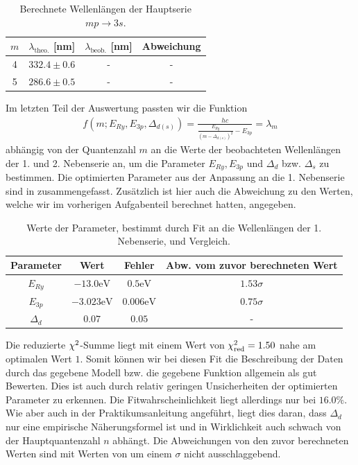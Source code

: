 \begin{table}[H]
  \centering
  \caption{Berechnete Wellenlängen der Hauptserie $mp \to 3s$.}
  \vspace*{0.5em}
  \begin{tabular}{c c c c}
      \hline
      $m$ & $\lambda_{\text{theo.}}$ [nm] & $\lambda_{\text{beob.}}$ [nm] & Abweichung \\
      \hline
      4  & $332.4 \pm 0.6$ & -     & -     \\
      5  & $286.6 \pm 0.5$  & - & - \\
      \hline
  \end{tabular}
  \label{tab:wellenlaengen_hs_zsfm}
\end{table}

Im letzten Teil der Auswertung passten wir die Funktion
\begin{align}
  f(m;E_{Ry}, E_{3p}, \Delta_{d(s)}) = \frac{hc}{\frac{E_{Ry}}{(m - \Delta_{d(s)})^2} - E_{3p}} = \lambda_m
\end{align}
abhängig von der Quantenzahl $m$ an die Werte der beobachteten Wellenlängen der 1. und 2. Nebenserie an, um die Parameter $E_{Ry}, E_{3p}$ und $\Delta_{d}$ bzw. $\Delta_{s}$ zu bestimmen. Die optimierten Parameter aus der Anpassung an die 1. Nebenserie sind in  zusammengefasst. Zusätzlich ist hier auch die Abweichung zu den Werten, welche wir im vorherigen Aufgabenteil berechnet hatten, angegeben.


\begin{table}[H]
  \centering
  \caption{Werte der Parameter, bestimmt durch Fit an die Wellenlängen der 1. Nebenserie, und Vergleich.}
  \vspace*{0.5em}
  \begin{tabular}{c c c c}
      \hline
      Parameter & Wert & Fehler & Abw. vom zuvor berechneten Wert \\
      \hline
      $E_{Ry}$  & $-13.0 \si{\electronvolt}$ & $0.5\si{\electronvolt}$ & $1.53\sigma$ \\
      $E_{3p}$  & $-3.023\si{\electronvolt}$  & $0.006\si{\electronvolt}$ & $0.75\sigma$ \\
      $\Delta_{d}$  & $0.07$  & $0.05$ & - \\
      \hline
  \end{tabular}
  \label{tab:fit_1ns_vergl}
\end{table}

Die reduzierte $\chi^{2}$-Summe liegt mit einem Wert von $\chi^{2}_{\mathrm{red}} = 1.50$ nahe am optimalen Wert $1$. Somit können wir bei diesen Fit die Beschreibung der Daten durch das gegebene Modell bzw. die gegebene Funktion allgemein als gut Bewerten. Dies ist auch durch relativ geringen Unsicherheiten der optimierten Parameter zu erkennen. Die Fitwahrscheinlichkeit liegt allerdings nur bei $16.0\%$. Wie aber auch in der Praktikumsanleitung angeführt, liegt dies daran, dass $\Delta_d$ nur eine empirische Näherungsformel ist und in Wirklichkeit auch schwach von der Hauptquantenzahl $n$ abhängt. Die Abweichungen von den zuvor berechneten Werten sind mit Werten von um einem $\sigma$ nicht ausschlaggebend.

